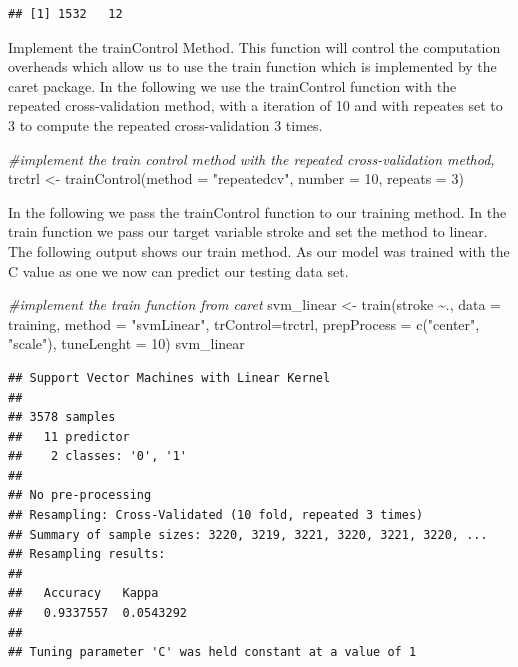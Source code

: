 \documentclass[
]{article}
\newenvironment{Shaded}{\begin{snugshade}}{\end{snugshade}}
\newcommand{\AttributeTok}[1]{\textcolor[rgb]{0.77,0.63,0.00}{#1}}
\newcommand{\CommentTok}[1]{\textcolor[rgb]{0.56,0.35,0.01}{\textit{#1}}}
\newcommand{\DecValTok}[1]{\textcolor[rgb]{0.00,0.00,0.81}{#1}}
\newcommand{\FunctionTok}[1]{\textcolor[rgb]{0.00,0.00,0.00}{#1}}
\newcommand{\NormalTok}[1]{#1}
\newcommand{\OtherTok}[1]{\textcolor[rgb]{0.56,0.35,0.01}{#1}}
\newcommand{\SpecialCharTok}[1]{\textcolor[rgb]{0.00,0.00,0.00}{#1}}
\newcommand{\StringTok}[1]{\textcolor[rgb]{0.31,0.60,0.02}{#1}}
\renewcommand{\=}[1]{\stackrel{#1}{=}}
\theoremstyle{definition}
\theoremstyle{remark}
\begin{document}
\begin{verbatim}
## [1] 1532   12
\end{verbatim}

Implement the trainControl Method. This function will control the computation overheads which allow us to use the train function which is implemented by the caret package. In the following we use the trainControl function with the repeated cross-validation method, with a iteration of 10 and with repeates set to 3 to compute the repeated cross-validation 3 times.

\begin{Shaded}
\begin{Highlighting}[]
\CommentTok{\#implement the train control method with the repeated cross{-}validation method, }
\NormalTok{trctrl }\OtherTok{\textless{}{-}} \FunctionTok{trainControl}\NormalTok{(}\AttributeTok{method =} \StringTok{"repeatedcv"}\NormalTok{, }\AttributeTok{number =} \DecValTok{10}\NormalTok{, }\AttributeTok{repeats =} \DecValTok{3}\NormalTok{)}
\end{Highlighting}
\end{Shaded}

In the following we pass the trainControl function to our training method. In the train function we pass our target variable stroke and set the method to linear. The following output shows our train method. As our model was trained with the C value as one we now can predict our testing data set.

\begin{Shaded}
\begin{Highlighting}[]
\CommentTok{\#implement the train function from caret}
\NormalTok{svm\_linear }\OtherTok{\textless{}{-}} \FunctionTok{train}\NormalTok{(stroke }\SpecialCharTok{\textasciitilde{}}\NormalTok{., }\AttributeTok{data =}\NormalTok{ training, }\AttributeTok{method =} \StringTok{"svmLinear"}\NormalTok{,}
                    \AttributeTok{trControl=}\NormalTok{trctrl,}
                    \AttributeTok{prepProcess =} \FunctionTok{c}\NormalTok{(}\StringTok{"center"}\NormalTok{, }\StringTok{"scale"}\NormalTok{),}
                    \AttributeTok{tuneLenght =} \DecValTok{10}\NormalTok{)}
\NormalTok{svm\_linear}
\end{Highlighting}
\end{Shaded}

\begin{verbatim}
## Support Vector Machines with Linear Kernel 
## 
## 3578 samples
##   11 predictor
##    2 classes: '0', '1' 
## 
## No pre-processing
## Resampling: Cross-Validated (10 fold, repeated 3 times) 
## Summary of sample sizes: 3220, 3219, 3221, 3220, 3221, 3220, ... 
## Resampling results:
## 
##   Accuracy   Kappa    
##   0.9337557  0.0543292
## 
## Tuning parameter 'C' was held constant at a value of 1
\end{verbatim}
\end{document}
